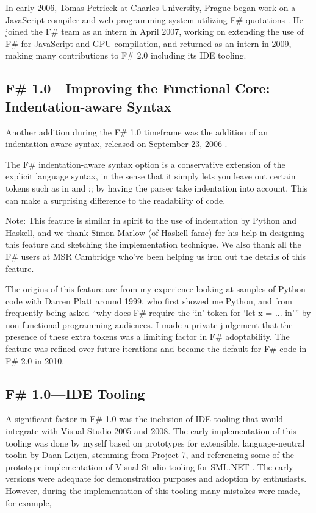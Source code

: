 \documentclass[acmsmall,screen]{acmart}
\begin{document}
In early 2006, Tomas Petricek at Charles University, Prague began work on a JavaScript compiler and web programming
system utilizing F\# quotations \citep{RefPetricekThesis}. He
joined the F\# team as an intern in April 2007, working on extending the use of F\# for JavaScript and GPU compilation,
and returned as an intern in 2009, making many contributions to F\# 2.0 including its IDE tooling.

\subsection*{F\# 1.0---Improving the Functional Core: Indentation-aware Syntax}

Another addition during the F\# 1.0 timeframe was the addition of an indentation-aware syntax, released on
September 23, 2006 \citep{RefIndentSyntax}.

\begin{verbquote}
The F# indentation-aware syntax option is a conservative extension of the explicit language syntax, in the sense that it simply lets you leave out certain tokens such as in and ;; by having the parser take indentation into account. This can make a surprising difference to the readability of code. 

Note: This feature is similar in spirit to the use of indentation by Python and Haskell, and we thank Simon Marlow (of Haskell fame) for his help in designing this feature and sketching the implementation technique. We also thank all the F# users at MSR Cambridge who've been helping us iron out the details of this feature. 
\end{verbquote}

The origins of this feature are from my experience looking at samples of Python code with Darren Platt around 1999, who
first showed me Python, and from frequently
being asked “why does F\# require the ‘in’ token for ‘let x = ... in’” by non-functional-programming audiences.  I made
a private judgement that the presence of these extra tokens was a limiting factor in F\# adoptability.  The feature was refined
over future iterations and became the default for F\# code in F\# 2.0 in 2010.


\subsection*{F\# 1.0---IDE Tooling}

A significant factor in F\# 1.0 was the inclusion of IDE tooling that would integrate with Visual Studio 2005 and 2008.
The early implementation of this tooling was done by myself based on prototypes for extensible, language-neutral toolin
 by Daan Leijen, stemming from Project 7, and referencing some of the prototype implementation of Visual Studio tooling
for SML.NET \citep{Benton2004}. The early versions were adequate for demonstration purposes and
adoption by enthusiasts.  However, during the implementation of this tooling many mistakes were made, for example, 
\end{document}
